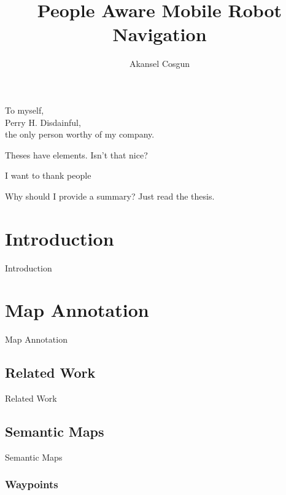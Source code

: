 \documentclass[12pt]{gatech-thesis}
\title{People Aware Mobile Robot Navigation} %
\author{Akansel Cosgun}
\begin{document}
%

\begin{preliminary}
\begin{dedication}
\null\vfil
{\large
\begin{center}
To myself,\\\vspace{12pt}
Perry H. Disdainful,\\\vspace{12pt}
the only person worthy of my company.
\end{center}}
\vfil\null
\end{dedication}
\begin{preface}
Theses have elements.  Isn't that nice?
\end{preface}
\begin{acknowledgements}
I want to thank people
\end{acknowledgements}
\contents
\begin{summary}
Why should I provide a summary?  Just read the thesis.
\end{summary}
\end{preliminary}
\chapter{Introduction}

Introduction


\chapter{Map Annotation}

Map Annotation
  
\section{Related Work}

Related Work

\section{Semantic Maps}

Semantic Maps

\subsection{Waypoints}
\end{document}
